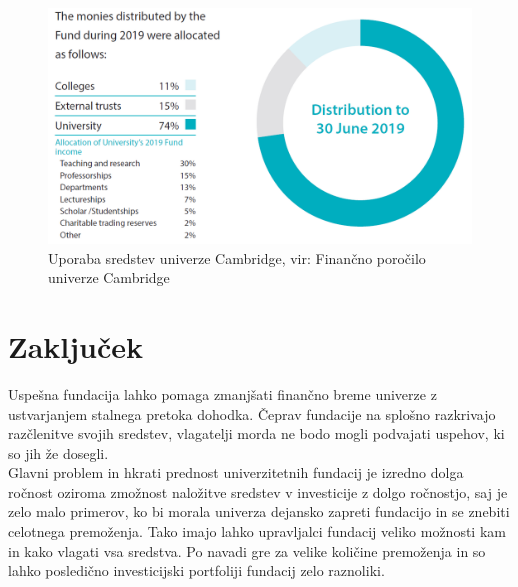 \documentclass[12pt, a4paper]{article}
\begin{document}
\begin{figure}[!h]
\centering
\includegraphics[width = 14 cm]{slike/cambridge.png}
\caption{Uporaba sredstev univerze Cambridge, vir: Finančno poročilo univerze Cambridge}
\label{Slika 5}
\end{figure}


\newpage
\section[Zaključek]{Zaključek}

Uspešna fundacija lahko pomaga zmanjšati finančno breme univerze z ustvarjanjem stalnega pretoka dohodka. Čeprav fundacije na splošno razkrivajo razčlenitve svojih sredstev, vlagatelji morda ne bodo mogli podvajati uspehov, ki so jih že dosegli.\\

Glavni problem in hkrati prednost univerzitetnih fundacij je izredno dolga ročnost oziroma zmožnost naložitve sredstev v investicije z dolgo ročnostjo, saj je zelo malo primerov, ko bi morala univerza dejansko zapreti fundacijo in se znebiti celotnega premoženja. Tako imajo lahko upravljalci fundacij veliko možnosti kam in kako vlagati vsa sredstva. Po navadi gre za velike količine premoženja in so lahko posledično investicijski portfoliji fundacij zelo raznoliki.

\newpage
\end{document}
